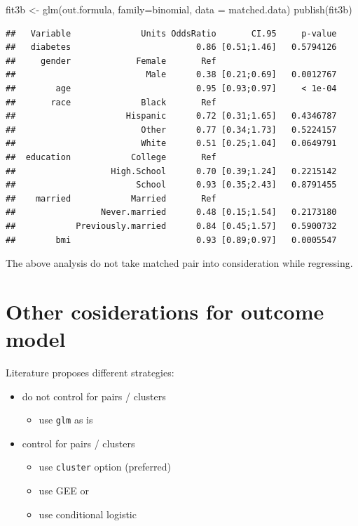 \documentclass[
]{book}
\newenvironment{Shaded}{\begin{snugshade}}{\end{snugshade}}
\newcommand{\AttributeTok}[1]{\textcolor[rgb]{0.77,0.63,0.00}{#1}}
\newcommand{\FunctionTok}[1]{\textcolor[rgb]{0.00,0.00,0.00}{#1}}
\newcommand{\NormalTok}[1]{#1}
\newcommand{\OtherTok}[1]{\textcolor[rgb]{0.56,0.35,0.01}{#1}}
\providecommand{\tightlist}{%
  \setlength{\itemsep}{0pt}\setlength{\parskip}{0pt}}
\begin{document}
\begin{Shaded}
\begin{Highlighting}[]
\NormalTok{fit3b }\OtherTok{\textless{}{-}} \FunctionTok{glm}\NormalTok{(out.formula,}
            \AttributeTok{family=}\NormalTok{binomial, }\AttributeTok{data =}\NormalTok{ matched.data)}
\FunctionTok{publish}\NormalTok{(fit3b)}
\end{Highlighting}
\end{Shaded}

\begin{verbatim}
##   Variable              Units OddsRatio       CI.95     p-value 
##   diabetes                         0.86 [0.51;1.46]   0.5794126 
##     gender             Female       Ref                         
##                          Male      0.38 [0.21;0.69]   0.0012767 
##        age                         0.95 [0.93;0.97]     < 1e-04 
##       race              Black       Ref                         
##                      Hispanic      0.72 [0.31;1.65]   0.4346787 
##                         Other      0.77 [0.34;1.73]   0.5224157 
##                         White      0.51 [0.25;1.04]   0.0649791 
##  education            College       Ref                         
##                   High.School      0.70 [0.39;1.24]   0.2215142 
##                        School      0.93 [0.35;2.43]   0.8791455 
##    married            Married       Ref                         
##                 Never.married      0.48 [0.15;1.54]   0.2173180 
##            Previously.married      0.84 [0.45;1.57]   0.5900732 
##        bmi                         0.93 [0.89;0.97]   0.0005547
\end{verbatim}

The above analysis do not take matched pair into consideration while regressing.

\hypertarget{other-cosiderations-for-outcome-model}{%
\section{Other cosiderations for outcome model}\label{other-cosiderations-for-outcome-model}}

Literature proposes different strategies:

\begin{itemize}
\tightlist
\item
  do not control for pairs / clusters

  \begin{itemize}
  \tightlist
  \item
    use \texttt{glm} as is
  \end{itemize}
\item
  control for pairs / clusters

  \begin{itemize}
  \tightlist
  \item
    use \texttt{cluster} option (preferred)
  \item
    use GEE or
  \item
    use conditional logistic
  \end{itemize}
\end{itemize}
\end{document}
